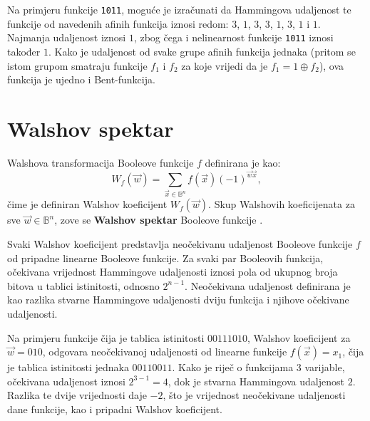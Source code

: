 Na primjeru funkcije \texttt{1011}, moguće je izračunati da Hammingova udaljenost te funkcije od navedenih afinih funkcija iznosi redom: $3$, $1$, $3$, $3$, $1$, $3$, $1$ i $1$.
Najmanja udaljenost iznosi $1$, zbog čega i nelinearnost funkcije \texttt{1011} iznosi također $1$.
Kako je udaljenost od svake grupe afinih funkcija jednaka (pritom se istom grupom smatraju funkcije $f_1$ i $f_2$ za koje vrijedi da je $f_1 = 1 \oplus f_2$), ova funkcija je ujedno i Bent-funkcija.

\section {Walshov spektar}
Walshova transformacija Booleove funkcije $f$ definirana je kao:
\begin{equation}\label{eq:walsh transform}
    W_f(\vec{w}) = \sum_{\vec{x} \in \mathds{B}^n}f(\vec{x})(-1)^{\vec{w}\vec{x}},
\end{equation}
čime je definiran Walshov koeficijent $W_f(\vec{w})$.
Skup Walshovih koeficijenata za sve $\vec{w} \in \mathds{B}^n$, zove se \textbf{Walshov spektar} Booleove funkcije \cite{CryptographicBooleanFunctions}.

Svaki Walshov koeficijent predstavlja neočekivanu udaljenost  \cite{MeasuringBoolean} Booleove funkcije $f$ od pripadne linearne Booleove funkcije.
Za svaki par Booleovih funkcija, očekivana vrijednost Hammingove udaljenosti iznosi pola od ukupnog broja bitova u tablici istinitosti, odnosno $2^{n-1}$.
Neočekivana udaljenost definirana je kao razlika stvarne Hammingove udaljenosti dviju funkcija i njihove očekivane udaljenosti.

Na primjeru funkcije čija je tablica istinitosti $00111010$, Walshov koeficijent za $\vec{w} = 010$, odgovara neočekivanoj udaljenosti od linearne funkcije $f(\vec{x}) = x_1$, čija je tablica istinitosti jednaka $00110011$.
Kako je riječ o funkcijama $3$ varijable, očekivana udaljenost iznosi $2^{3-1} = 4$, dok je stvarna Hammingova udaljenost $2$.
Razlika te dvije vrijednosti daje $-2$, što je vrijednost neočekivane udaljenosti dane funkcije, kao i pripadni Walshov koeficijent.

